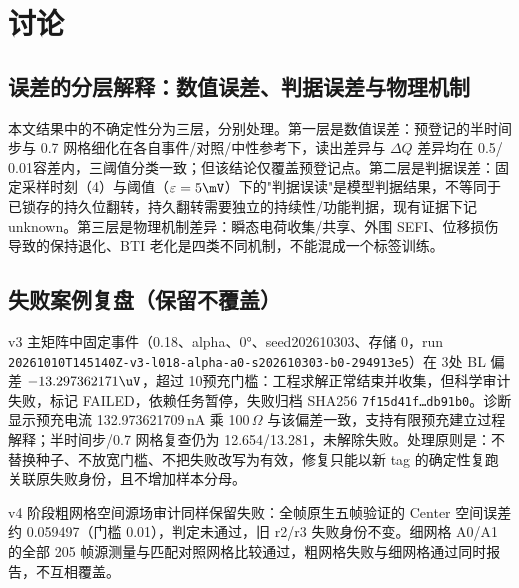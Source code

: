 \section{讨论}

\subsection{误差的分层解释：数值误差、判据误差与物理机制}

本文结果中的不确定性分为三层，分别处理。第一层是数值误差：预登记的半时间步与 0.7 网格细化在各自事件/对照/中性参考下，读出差异与 $\Delta Q$ 差异均在 0.5\mV / 0.01\fC 容差内，三阈值分类一致；但该结论仅覆盖预登记点。第二层是判据误差：固定采样时刻（4\ns）与阈值（$\varepsilon=5\mV$）下的"判据误读"是模型判据结果，不等同于已锁存的持久位翻转，持久翻转需要独立的持续性/功能判据，现有证据下记 unknown。第三层是物理机制差异：瞬态电荷收集/共享、外围 SEFI、位移损伤导致的保持退化、BTI 老化是四类不同机制，不能混成一个标签训练。

\subsection{失败案例复盘（保留不覆盖）}

v3 主矩阵中固定事件（0.18\um、alpha、0°、seed202610303、存储 0，run \texttt{20261010T145140Z-v3-l018-alpha-a0-s202610303-b0-294913e5}）在 3\ns 处 BL 偏差 $-13.297362171\uV$，超过 10\uV 预充门槛：工程求解正常结束并收集，但科学审计失败，标记 FAILED，依赖任务暂停，失败归档 SHA256 \texttt{7f15d41f…db91b0}。诊断显示预充电流 132.973621709\,nA 乘 100\,$\Omega$ 与该偏差一致，支持有限预充建立过程解释；半时间步/0.7 网格复查仍为 12.654/13.281\uV，未解除失败。处理原则是：不替换种子、不放宽门槛、不把失败改写为有效，修复只能以新 tag 的确定性复跑关联原失败身份，且不增加样本分母。

v4 阶段粗网格空间源场审计同样保留失败：全帧原生五帧验证的 Center 空间误差约 0.059497（门槛 0.01\um），判定未通过，旧 r2/r3 失败身份不变。细网格 A0/A1 的全部 205 帧源测量与匹配对照网格比较通过，粗网格失败与细网格通过同时报告，不互相覆盖。

